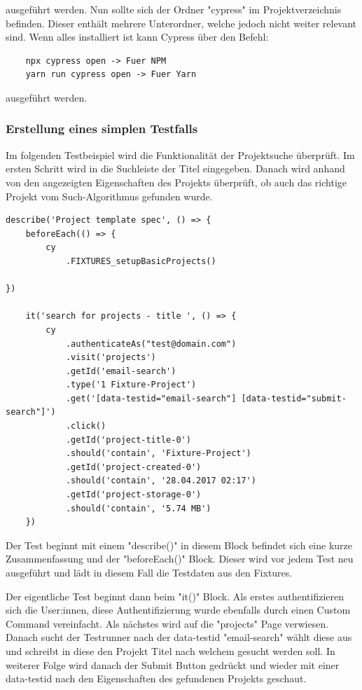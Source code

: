 ausgeführt werden.
Nun sollte sich der Ordner "cypress" im Projektverzeichnis befinden. Dieser enthält mehrere Unterordner, welche jedoch nicht weiter relevant sind. Wenn alles installiert ist kann Cypress über den Befehl:

\begin{lstlisting}
    npx cypress open -> Fuer NPM
    yarn run cypress open -> Fuer Yarn
\end{lstlisting}

ausgeführt werden.
\cite{Integration_von_Cypress}
\newpage
\subsubsection{Erstellung eines simplen Testfalls}
Im folgenden Testbeispiel wird die Funktionalität der Projektsuche überprüft. Im ersten Schritt wird in die Suchleiste der Titel eingegeben. Danach wird anhand von den angezeigten Eigenschaften des Projekts überprüft, ob auch das richtige Projekt vom Such-Algorithmus gefunden wurde. 

\begin{lstlisting}[caption=Erstellen eines simplen Testfalls]
describe('Project template spec', () => {
    beforeEach(() => {
        cy
            .FIXTURES_setupBasicProjects()

})
    
    it('search for projects - title ', () => {
        cy
            .authenticateAs("test@domain.com")
            .visit('projects')
            .getId('email-search')
            .type('1 Fixture-Project')
            .get('[data-testid="email-search"] [data-testid="submit-search"]')
            .click()
            .getId('project-title-0')
            .should('contain', 'Fixture-Project')
            .getId('project-created-0')
            .should('contain', '28.04.2017 02:17')
            .getId('project-storage-0')
            .should('contain', '5.74 MB')
    })
\end{lstlisting}

Der Test beginnt mit einem "describe()" in diesem Block befindet sich eine kurze Zusammenfassung und der "beforeEach()" Block. Dieser wird vor jedem Test neu ausgeführt und lädt in diesem Fall die Testdaten aus den Fixtures.

Der eigentliche Test beginnt dann beim "it()" Block. Als erstes authentifizieren sich die User:innen, diese Authentifizierung wurde ebenfalls durch einen Custom Command vereinfacht. Als nächstes wird auf die "projects" Page verwiesen. Danach sucht der Testrunner nach der data-testid "email-search" wählt diese aus und schreibt in diese den Projekt Titel nach welchem gesucht werden soll. In weiterer Folge wird danach der Submit Button gedrückt und wieder mit einer data-testid nach den Eigenschaften des gefundenen Projekts geschaut.\newpage

